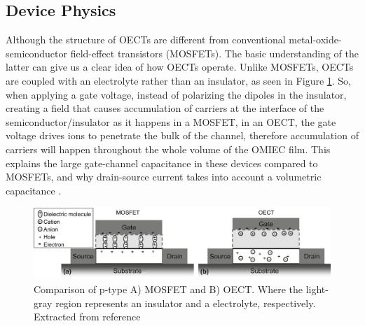 

\subsection{Device Physics} \label{subsec:devphy}

Although the structure of OECTs are different from conventional metal-oxide-semiconductor field-effect transistors (MOSFETs). The basic understanding of the latter can give us a clear idea of how OECTs operate. Unlike MOSFETs, OECTs are coupled with an electrolyte rather than an insulator, as seen in Figure \ref{fig:vsMOS}. So, when applying a gate voltage, instead of polarizing the dipoles in the insulator, creating a field that causes accumulation of carriers at the interface of the semiconductor/insulator as it happens in a MOSFET, in an OECT, the gate voltage drives ions to penetrate the bulk of the channel, therefore accumulation of carriers will happen throughout the whole volume of the OMIEC film. This explains the large gate-channel capacitance in these devices compared to MOSFETs, and why drain-source current takes into account a volumetric capacitance \cite{friedleinDevicePhysicsOrganic2018}.


\begin{figure}[h]
  \centering
  \includegraphics[width=\textwidth]{Images/pdf/MOSFETvsOECTs.pdf}
  \caption[Device physics of MOSFET vs OECT]{Comparison of p-type A) MOSFET and B) OECT. Where the light-gray region represents an insulator and a electrolyte, respectively. Extracted from reference  \cite{friedleinDevicePhysicsOrganic2018}}
  \label{fig:vsMOS}
\end{figure}

